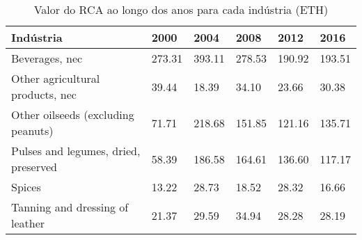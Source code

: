 \begin{table}
\centering
\caption{Valor do RCA ao longo dos anos para cada indústria (ETH)}
\begin{tabular}{p{6cm}p{1.5cm}p{1.5cm}p{1.5cm}p{1.5cm}p{1.5cm}}
\toprule
                           Indústria &   2000 &   2004 &   2008 &   2012 &   2016 \\
\midrule
                      Beverages, nec & 273.31 & 393.11 & 278.53 & 190.92 & 193.51 \\
    Other agricultural products, nec &  39.44 &  18.39 &  34.10 &  23.66 &  30.38 \\
  Other oilseeds (excluding peanuts) &  71.71 & 218.68 & 151.85 & 121.16 & 135.71 \\
Pulses and legumes, dried, preserved &  58.39 & 186.58 & 164.61 & 136.60 & 117.17 \\
                              Spices &  13.22 &  28.73 &  18.52 &  28.32 &  16.66 \\
     Tanning and dressing of leather &  21.37 &  29.59 &  34.94 &  28.28 &  28.19 \\
\bottomrule
\end{tabular}
\end{table}
